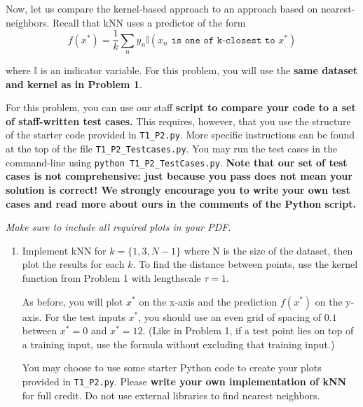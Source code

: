 \documentclass[submit]{harvardml}
\begin{document}
\newpage


\begin{problem}

Now, let us compare the kernel-based approach to an approach based on
nearest-neighbors.  Recall that kNN uses a predictor of the form
  \begin{equation*}
    f(x^*) = \frac{1}{k} \sum_n y_n \mathbb{I}(x_n \texttt{ is one of k-closest to } x^*)
  \end{equation*}

\noindent where $\mathbb{I}$ is an indicator variable. For this problem, you will use the \textbf{same dataset and kernel as in Problem 1}.


For this problem, you can use our staff \textbf{script to compare your code to a set of staff-written test cases.} This requires, however, that you use the structure of the starter code provided in \texttt{T1\_P2.py}. More specific instructions can be found at the top of the file \texttt{T1\_P2\_Testcases.py}. You may run the test cases in the command-line using \texttt{python T1\_P2\_TestCases.py}.
\textbf{Note that our set of test cases is not comprehensive: just because you pass does not mean your solution is correct! We strongly encourage you to write your own test cases and read more about ours in the comments of the Python script.}

\vspace{0.5cm}
\noindent\emph{Make sure to include all required plots in your PDF.}


\begin{enumerate}

\item Implement kNN for $k=\{1, 3, N-1\}$ where N is the size of the dataset, then plot the results for each $k$. To find the distance between points, use the kernel function from Problem 1 with lengthscale $\tau=1$. 

As before, you will plot $x^*$ on the x-axis and the prediction $f(x^*)$ on the y-axis.  For the test inputs $x^*$, you should use an even grid of spacing of $0.1$ between $x^* = 0$ and $x^* = 12$.  (Like in Problem 1, if a test point lies on top of a training input, use the formula without excluding that training input.)
  
  You may choose to use some starter Python code to create your plots
  provided in \verb|T1_P2.py|.  Please \textbf{write your own
    implementation of kNN} for full credit.  Do not use external
  libraries to find nearest neighbors.
  

\end{enumerate}
\end{problem}
\end{document}
